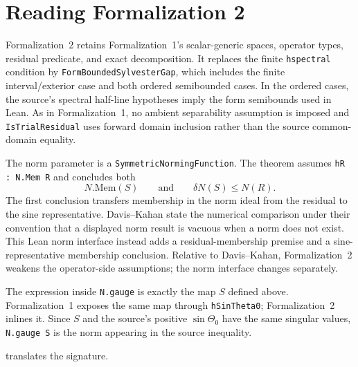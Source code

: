 \section{Reading Formalization 2}
\label{app:formalization2}

Formalization~2 retains Formalization~1's scalar-generic spaces, operator
types, residual predicate, and exact decomposition.  It replaces the finite
\texttt{hspectral} condition by \texttt{FormBoundedSylvesterGap}, which includes
the finite interval/exterior case and both ordered semibounded cases.  In the
ordered cases, the source's spectral half-line hypotheses imply the form
semibounds used in Lean.  As in Formalization~1, no ambient separability
assumption is imposed and \texttt{IsTrialResidual} uses forward domain inclusion
rather than the source common-domain equality.

The norm parameter is a \texttt{SymmetricNormingFunction}.  The theorem assumes
\texttt{hR : N.Mem R} and concludes both
\[
  N.\mathrm{Mem}(S)
  \qquad\text{and}\qquad
  \delta N(S)\le N(R).
\]
The first conclusion transfers membership in the norm ideal from the residual
to the sine representative.  Davis--Kahan state the numerical comparison under
their convention that a displayed norm result is vacuous when a norm does not
exist.  This Lean norm interface instead adds a residual-membership premise and
a sine-representative membership conclusion.  Relative to Davis--Kahan,
Formalization~2 weakens the operator-side assumptions; the norm interface
changes separately.

The expression inside \texttt{N.gauge} is exactly the map $S$ defined above.
Formalization~1 exposes the same map through \texttt{hSinTheta0};
Formalization~2 inlines it.  Since $S$ and the source's positive
$\sin\Theta_0$ have the same singular values, \texttt{N.gauge S} is the norm
appearing in the source inequality.

 translates the signature.

